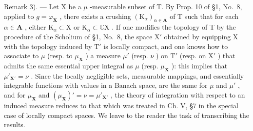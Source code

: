 Remark 3). --- Let X be a \(\mu\) -measurable subset of T. By Prop. 10 of §1, No.~8, applied to \(g = \varphi_{\mathbf{X}}\) , there exists a crushing \((\mathrm{K}_{\alpha})_{\alpha \in \mathbf{A}}\) of T such that for each \(\alpha \in \mathbf{A}\) , either \(\mathrm{K}_{\alpha} \subset \mathrm{X}\) or \(\mathrm{K}_{\alpha} \subset \mathbb{C}\mathrm{X}\) . If one modifies the topology of T by the procedure of the Scholium of §1, No.~8, the space \(\mathrm{X}'\) obtained by equipping X with the topology induced by \(\mathrm{T}'\) is locally compact, and one knows how to associate to \(\mu\) (resp. to \(\mu_{\mathbf{X}}\) ) a measure \(\mu'\) (resp. \(\nu\) ) on \(\mathrm{T}'\) (resp. on \(\mathrm{X}'\) ) that admits the same essential upper integral as \(\mu\) (resp. \(\mu_{\mathbf{X}}\) ): this implies that \(\mu'_{\mathbf{X}'} = \nu\) . Since the locally negligible sets, measurable mappings, and essentially integrable functions with values in a Banach space, are the same for \(\mu\) and \(\mu'\) , and for \(\mu_{\mathbf{X}}\) and \((\mu_{\mathbf{X}})' = \nu = \mu'_{\mathbf{X}'}\) , the theory of integration with respect to an induced measure reduces to that which was treated in Ch. V, §7 in the special case of locally compact spaces. We leave to the reader the task of transcribing the results.
